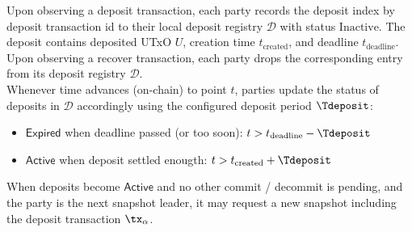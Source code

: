 \quad Upon observing a deposit transaction,
each party records the deposit index by deposit transaction id to their local
deposit registry $\mathcal{D}$ with status $\text{Inactive}$. The deposit
contains deposited UTxO $U$, creation time $t_{\text{created}}$, and deadline
$t_{\text{deadline}}$. \\

\quad Upon observing a recover transaction,
each party drops the corresponding entry from its deposit registry
$\mathcal{D}$. \\

\quad Whenever time advances (on-chain) to point
$t$, parties update the status of deposits in $\mathcal{D}$ accordingly using
the configured deposit period $\Tdeposit$:
\begin{itemize}
  \item $\mathsf{Expired}$ when deadline passed (or too soon): $t > t_{\text{deadline}} - \Tdeposit$
  \item $\mathsf{Active}$ when deposit settled enougth: $t > t_{\text{created}} + \Tdeposit$
\end{itemize}
When deposits become $\mathsf{Active}$ and no other commit / decommit is
pending, and the party is the next snapshot leader, it may request a new
snapshot including the deposit transaction $\tx_{\alpha}$. \\


